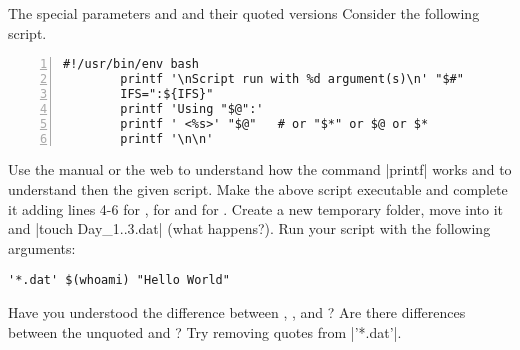 
\begin{exercise}[Instructive]{The special parameters \bash{*} and \bash{\@} and their quoted versions}
    Consider the following script.
    \begin{lstlisting}[style=MyBash, numbers=left]
        #!/usr/bin/env bash
        printf '\nScript run with %d argument(s)\n' "$#"
        IFS=":${IFS}"
        printf 'Using "$@":'
        printf ' <%s>' "$@"   # or "$*" or $@ or $*
        printf '\n\n'
    \end{lstlisting}
    Use the manual or the web to understand how the command \bash|printf| works and to understand then the given script.
    Make the above script executable and complete it adding lines 4-6 for , for  and for \bash{$*}.
    Create a new temporary folder, move into it and \bash|touch Day_{1..3}.dat| (what happens?).
    Run your script with the following arguments:
    \begin{lstlisting}[style=MyBash]
        '*.dat' $(whoami) "Hello World"
    \end{lstlisting}
    Have you understood the difference between , ,  and \bash{$*}?
    Are there differences between the unquoted  and \bash{$*}?
    Try removing quotes from \bash|'*.dat'|.
\end{exercise}